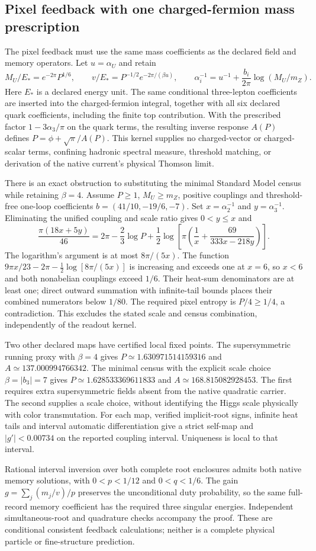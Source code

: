 \subsection{Pixel feedback with one charged-fermion mass prescription}
\label{sec:pixel-mass-closure}
The pixel feedback must use the same mass coefficients as the declared
field and memory operators.  Let $u=\alpha_U$ and retain
\[
 M_U/E_*=e^{-2\pi}P^{1/6},\qquad
 v/E_*=P^{-1/2}e^{-2\pi/(\beta u)},\qquad
 \alpha_i^{-1}=u^{-1}+\frac{b_i}{2\pi}\log(M_U/m_Z).
\]
Here $E_*$ is a declared energy unit.  The same conditional three-lepton
coefficients are inserted into the charged-fermion integral, together with
all six declared quark coefficients, including the finite top contribution.
With the prescribed factor $1-3\alpha_3/\pi$ on the quark terms, the resulting
inverse response $A(P)$ defines $P=\phi+\sqrt\pi/A(P)$.
This kernel supplies no charged-vector or charged-scalar terms, confining
hadronic spectral measure, threshold matching, or derivation of the native
current's physical Thomson limit.

There is an exact obstruction to substituting the minimal Standard Model
census while retaining $\beta=4$.  Assume $P\ge1$, $M_U\ge m_Z$, positive
couplings and threshold-free one-loop coefficients
$b=(41/10,-19/6,-7)$.  Set $x=\alpha_2^{-1}$ and $y=\alpha_3^{-1}$.
Eliminating the unified coupling and scale ratio gives $0<y\le x$ and
\[
 \frac{\pi(18x+5y)}{46}
 =2\pi-\frac23\log P+\frac12\log\!\left[
 \pi\left(\frac1x+\frac{69}{333x-218y}\right)\right].
\]
The logarithm's argument is at most $8\pi/(5x)$.
The function $9\pi x/23-2\pi-\tfrac12\log[8\pi/(5x)]$ is increasing and
exceeds one at $x=6$, so $x<6$ and both nonabelian couplings exceed $1/6$.
Their heat-sum denominators are at least one; direct outward summation with
infinite-tail bounds places their combined numerators below $1/80$.
The required pixel entropy is $P/4\ge1/4$, a contradiction.  This excludes
the stated scale and census combination, independently of the readout kernel.

Two other declared maps have certified local fixed points.  The
supersymmetric running proxy with $\beta=4$ gives
$P\simeq1.630971514159316$ and $A\simeq137.000994766342$.
The minimal census with the explicit scale choice $\beta=|b_3|=7$ gives
$P\simeq1.628533369611833$ and $A\simeq168.815082928453$.
The first requires extra supersymmetric fields absent from the native
quadratic carrier.  The second supplies a scale choice, without identifying
the Higgs scale physically with color transmutation.
For each map, verified implicit-root signs, infinite heat tails and interval
automatic differentiation give a strict self-map and $|g'|<0.00734$ on the
reported coupling interval.  Uniqueness is local to that interval.

Rational interval inversion over both complete root enclosures admits both
native memory solutions, with $0<p<1/12$ and $0<q<1/6$.  The gain
$g=\sum_j(m_j/v)/p$ preserves the unconditional duty probability, so the
same full-record memory coefficient has the required three singular energies.
Independent simultaneous-root and quadrature checks accompany the proof.
These are conditional consistent feedback calculations; neither is a complete
physical particle or fine-structure prediction.
